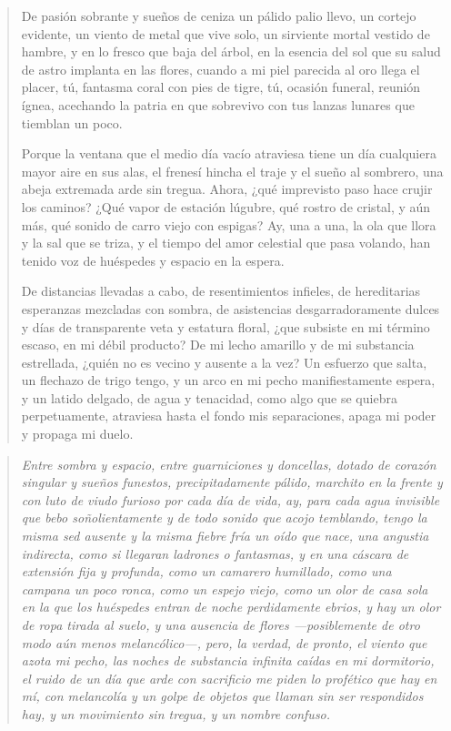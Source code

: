 \documentclass[12pt]{article}
\begin{document}
\clearpage
{}
\begin{verse}
De pasión sobrante y sueños de ceniza  
un pálido palio llevo, un cortejo evidente,  
un viento de metal que vive solo,  
un sirviente mortal vestido de hambre,  
y en lo fresco que baja del árbol, en la esencia del sol  
que su salud de astro implanta en las flores,  
cuando a mi piel parecida al oro llega el placer,  
tú, fantasma coral con pies de tigre,  
tú, ocasión funeral, reunión ígnea,  
acechando la patria en que sobrevivo  
con tus lanzas lunares que tiemblan un poco.  
  
Porque la ventana que el medio día vacío atraviesa  
tiene un día cualquiera mayor aire en sus alas,  
el frenesí hincha el traje y el sueño al sombrero,  
una abeja extremada arde sin tregua.  
Ahora, ¿qué imprevisto paso hace crujir los caminos?  
¿Qué vapor de estación lúgubre, qué rostro de cristal,  
y aún más, qué sonido de carro viejo con espigas?  
Ay, una a una, la ola que llora y la sal que se triza,  
y el tiempo del amor celestial que pasa volando,  
han tenido voz de huéspedes y espacio en la espera.  
  
De distancias llevadas a cabo, de resentimientos infieles,  
de hereditarias esperanzas mezcladas con sombra,  
de asistencias desgarradoramente dulces  
y días de transparente veta y estatura floral,  
¿que subsiste en mi término escaso, en mi débil producto?  
De mi lecho amarillo y de mi substancia estrellada,  
¿quién no es vecino y ausente a la vez?  
Un esfuerzo que salta, un flechazo de trigo  
tengo, y un arco en mi pecho manifiestamente espera,  
y un latido delgado, de agua y tenacidad,  
como algo que se quiebra perpetuamente,  
atraviesa hasta el fondo mis separaciones,  
apaga mi poder y propaga mi duelo.

\end{verse}

\clearpage
{}
\begin{verse}
\itshape
Entre sombra y espacio, entre guarniciones y doncellas,  
dotado de corazón singular y sueños funestos,  
precipitadamente pálido, marchito en la frente  
y con luto de viudo furioso por cada día de vida,  
ay, para cada agua invisible que bebo soñolientamente  
y de todo sonido que acojo temblando,  
tengo la misma sed ausente y la misma fiebre fría  
un oído que nace, una angustia indirecta,  
como si llegaran ladrones o fantasmas,  
y en una cáscara de extensión fija y profunda,  
como un camarero humillado, como una campana un poco ronca,  
como un espejo viejo, como un olor de casa sola  
en la que los huéspedes entran de noche perdidamente ebrios,  
y hay un olor de ropa tirada al suelo, y una ausencia de flores  
—posiblemente de otro modo aún menos melancólico—,  
pero, la verdad, de pronto, el viento que azota mi pecho,  
las noches de substancia infinita caídas en mi dormitorio,  
el ruido de un día que arde con sacrificio  
me piden lo profético que hay en mí, con melancolía  
y un golpe de objetos que llaman sin ser respondidos  
hay, y un movimiento sin tregua, y un nombre confuso.

\end{verse}
\end{document}
